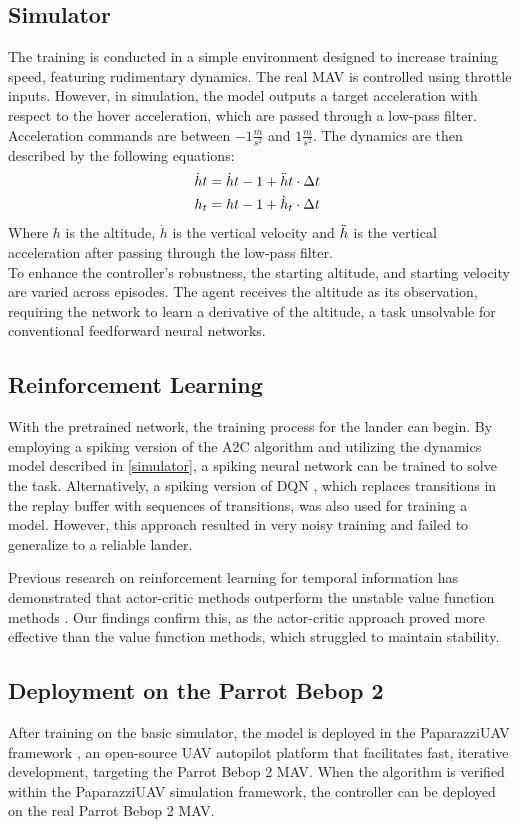\subsection{Simulator}\label{simulator}
The training is conducted in a simple environment designed to increase training speed, featuring rudimentary dynamics. The real MAV is controlled using throttle inputs. However, in simulation, the model outputs a target acceleration with respect to the hover acceleration, which are passed through a low-pass filter. Acceleration commands are between $-1 \frac{m}{s^2}$ and $1 \frac{m}{s^2}$. The dynamics are then described by the following equations:
\begin{align}\label{eq:dynamics}
\Dot{h}t &= \Dot{h}{t-1} + \Ddot{h}t \cdot \Delta t \\
h_t &= h{t-1} + \Dot{h}_t \cdot \Delta t \
\end{align}
Where $h$ is the altitude, $\Dot{h}$ is the vertical velocity and $\Ddot{h}$ is the vertical acceleration after passing through the low-pass filter. \\

To enhance the controller's robustness, the starting altitude, and starting velocity are varied across episodes. The agent receives the altitude as its observation, requiring the network to learn a derivative of the altitude, a task unsolvable for conventional feedforward neural networks. 


\subsection{Reinforcement Learning}
With the pretrained network, the training process for the lander can begin. By employing a spiking version of the A2C algorithm \cite{A3C, A2CvsA3C} and utilizing the dynamics model described in \autoref{simulator}, a spiking neural network can be trained to solve the task. Alternatively, a spiking version of DQN \cite{mnih2013playing}, which replaces transitions in the replay buffer with sequences of transitions, was also used for training a model. However, this approach resulted in very noisy training and failed to generalize to a reliable lander.

Previous research on reinforcement learning for temporal information has demonstrated that actor-critic methods outperform the unstable value function methods \cite{HeessMemory-basedNetworks, Yang2021RecurrentControl, Ni2021RecurrentPOMDPs}. Our findings confirm this, as the actor-critic approach proved more effective than the value function methods, which struggled to maintain stability.

\subsection{Deployment on the Parrot Bebop 2}
After training on the basic simulator, the model is deployed in the PaparazziUAV framework \cite{brisset2006Paparazzi}, an open-source UAV autopilot platform that facilitates fast, iterative development, targeting the Parrot Bebop 2 MAV. When the algorithm is verified within the PaparazziUAV simulation framework, the controller can be deployed on the real Parrot Bebop 2 MAV.